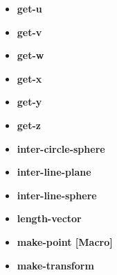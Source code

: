 \documentclass [11pt]{book}
\begin{document}
\begin{itemize}
\item {}
\label{prim:get-u}
\textbf{get-u}





\item {}
\label{prim:get-v}
\textbf{get-v}





\item {}
\label{prim:get-w}
\textbf{get-w}





\item {}
\label{prim:get-x}
\textbf{get-x}





\item {}
\label{prim:get-y}
\textbf{get-y}





\item {}
\label{prim:get-z}
\textbf{get-z}





\item {}
\label{prim:inter-circle-sphere}
\textbf{inter-circle-sphere}





\item {}
\label{prim:inter-line-plane}
\textbf{inter-line-plane}





\item {}
\label{prim:inter-line-sphere}
\textbf{inter-line-sphere}





\item {}
\label{prim:length-vector}
\textbf{length-vector}





\item {}
\label{prim:make-point}
\textbf{make-point [Macro]}





\item {}
\label{prim:make-transform}
\textbf{make-transform}






\end{itemize}
\end{document}
